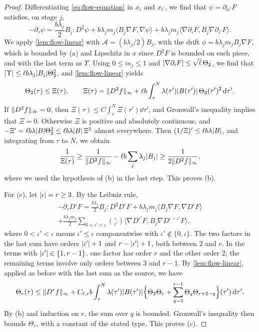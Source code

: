 \begin{proof}
Differentiating \eqref{eq:flow-equation} in $x_i$ and $x_{i'}$, we find that
$\psi=\partial_{ii'}F$ satisfies, on stage $j$,
\[
 -\partial_\tau\psi=\frac{b\lambda_j}{2}B_j\mathbin{:}D^2\psi
 +b\lambda_jm_j\bigl\langle B_j\nabla F,\nabla\psi\bigr\rangle
 +b\lambda_jm_j\bigl\langle\nabla\partial_iF,B_j\nabla\partial_{i'}F\bigr\rangle.
\]
We apply \cref{lem:flow-linear} with $\mathcal A=(b\lambda_j/2)B_j$, with the drift
$\phi=b\lambda_jm_jB_j\nabla F$, which is bounded by (a) and Lipschitz in $x$
since $D^2F$ is bounded on each piece, and with the last term as $\Upsilon$.
Using $0\le m_j\le1$ and $\lvert \nabla\partial_iF\rvert\le\sqrt\ell\,\Theta_2$, we find
that $\lvert \Upsilon\rvert\le\ell b\lambda_j\lvert B_j\rvert\Theta_2^2$, and \cref{lem:flow-linear}
yields
\[
 \Theta_2(\tau)\le \Xi(\tau),\qquad
 \Xi(\tau)=\lVert D^2f\rVert_\infty+\ell b\int_\tau^N\lambda(\tau')\lvert B(\tau')\rvert\,
 \Theta_2(\tau')^2\,\mathrm d\tau'.
\]
If $\lVert D^2f\rVert_\infty=0$, then $\Xi(\tau)\le C\int_\tau^N\Xi(\tau')\dd\tau'$, and
Gronwall's inequality implies that $\Xi=0$. Otherwise $\Xi$ is positive and absolutely
continuous, and $-\Xi'=\ell b\lambda\lvert B\rvert\Theta_2^2\le\ell b\lambda\lvert B\rvert\,\Xi^2$
almost everywhere. Then $(1/\Xi)'\le\ell b\lambda\lvert B\rvert$, and integrating from
$\tau$ to $N$, we obtain
\[
 \frac1{\Xi(\tau)}\ge\frac1{\lVert D^2f\rVert_\infty}-\ell b\sum_j\lambda_j\lvert B_j\rvert
 \ge\frac1{2\lVert D^2f\rVert_\infty},
\]
where we used the hypothesis of (b) in the last step. This proves (b).

For (c), let $\lvert \iota\rvert=r\ge3$. By the Leibniz rule,
\begin{multline*}
 -\partial_\tau D^\iota F=\frac{b\lambda_j}{2}B_j\mathbin{:}D^2D^\iota F
 +b\lambda_jm_j\bigl\langle B_j\nabla F,\nabla D^\iota F\bigr\rangle\\
 +\frac{b\lambda_jm_j}{2}\sum_{0<\iota'<\iota}\binom{\iota}{\iota'}
 \bigl\langle\nabla D^{\iota'}F,B_j\nabla D^{\iota-\iota'}F\bigr\rangle,
\end{multline*}
where $0<\iota'<\iota$ means $\iota'\le\iota$ componentwise with
$\iota'\notin\{0,\iota\}$. The two factors in the last sum have orders
$\lvert \iota'\rvert+1$ and $r-\lvert \iota'\rvert+1$, both between $2$ and $r$. In the terms
with $\lvert \iota'\rvert\in\{1,r-1\}$, one factor has order $r$ and the other order $2$;
the remaining terms involve only orders between $3$ and $r-1$. By
\cref{lem:flow-linear}, applied as before with the last sum as the source, we
have
\[
 \Theta_r(\tau)\le\lVert D^rf\rVert_\infty+C_{\ell,r}b\int_\tau^N\lambda(\tau')
 \lvert B(\tau')\rvert\Bigl\{\Theta_2\Theta_r+\sum_{q=3}^{r-1}\Theta_q\Theta_{r+2-q}\Bigr\}
 (\tau')\,\mathrm d\tau'.
\]
By (b) and induction on $r$, the sum over $q$ is bounded. Gronwall's inequality
then bounds $\Theta_r$, with a constant of the stated type. This proves (c).
\end{proof}

